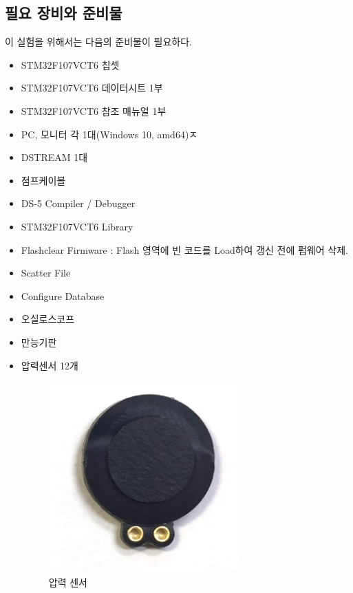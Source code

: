\documentclass[a4paper,11pt]{article}
\begin{document}
\begin{spacing}{1.6}
\subsection{필요 장비와 준비물}
  이 실험을 위해서는 다음의 준비물이 필요하다.
 \begin{itemize}
   \item STM32F107VCT6 칩셋
   \item STM32F107VCT6 데이터시트 1부
   \item STM32F107VCT6 참조 매뉴얼 1부
  \item PC, 모니터 각 1대(Windows 10, amd64)ㅈ
  \item DSTREAM 1대
  \item 점프케이블
  \item DS-5 Compiler / Debugger
  \item STM32F107VCT6 Library
  \item Flashclear Firmware : Flash 영역에 빈 코드를 Load하여 갱신 전에 펌웨어 삭제.
  \item Scatter File
  \item Configure Database
  \item 오실로스코프
  \item 만능기판
  \item 압력센서 12개
\begin{figure}[hbt!]
\centering
\includegraphics[scale=0.5]{m1.png}
\caption{압력 센서}
\label{Fig:Fig01}
\end{figure}


\end{itemize}
\end{spacing}
\end{document}
